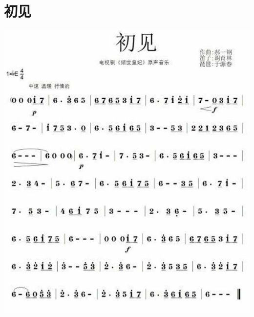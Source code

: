 \documentclass[cn,pad,chinese,chinesefont=nofont]{elegantbook}
\begin{document}
\section{初见}
    \includegraphics[width=\textwidth]{dongxiao/20200323初见.jpg}
\end{document}
